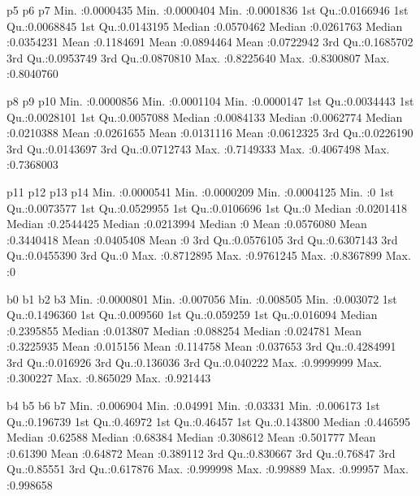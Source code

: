 \documentclass{article}
\begin{document}
\begin{Schunk}
\begin{Soutput}
       p5                  p6                  p7           
 Min.   :0.0000435   Min.   :0.0000404   Min.   :0.0001836  
 1st Qu.:0.0166946   1st Qu.:0.0068845   1st Qu.:0.0143195  
 Median :0.0570462   Median :0.0261763   Median :0.0354231  
 Mean   :0.1184691   Mean   :0.0894464   Mean   :0.0722942  
 3rd Qu.:0.1685702   3rd Qu.:0.0953749   3rd Qu.:0.0870810  
 Max.   :0.8225640   Max.   :0.8300807   Max.   :0.8040760  
                                                            
       p8                  p9                 p10           
 Min.   :0.0000856   Min.   :0.0001104   Min.   :0.0000147  
 1st Qu.:0.0034443   1st Qu.:0.0028101   1st Qu.:0.0057088  
 Median :0.0084133   Median :0.0062774   Median :0.0210388  
 Mean   :0.0261655   Mean   :0.0131116   Mean   :0.0612325  
 3rd Qu.:0.0226190   3rd Qu.:0.0143697   3rd Qu.:0.0712743  
 Max.   :0.7149333   Max.   :0.4067498   Max.   :0.7368003  
                                                            
      p11                 p12                 p13                 p14   
 Min.   :0.0000541   Min.   :0.0000209   Min.   :0.0004125   Min.   :0  
 1st Qu.:0.0073577   1st Qu.:0.0529955   1st Qu.:0.0106696   1st Qu.:0  
 Median :0.0201418   Median :0.2544425   Median :0.0213994   Median :0  
 Mean   :0.0576080   Mean   :0.3440418   Mean   :0.0405408   Mean   :0  
 3rd Qu.:0.0576105   3rd Qu.:0.6307143   3rd Qu.:0.0455390   3rd Qu.:0  
 Max.   :0.8712895   Max.   :0.9761245   Max.   :0.8367899   Max.   :0  
                                                                        
       b0                  b1                 b2                 b3          
 Min.   :0.0000801   Min.   :0.007056   Min.   :0.008505   Min.   :0.003072  
 1st Qu.:0.1496360   1st Qu.:0.009560   1st Qu.:0.059259   1st Qu.:0.016094  
 Median :0.2395855   Median :0.013807   Median :0.088254   Median :0.024781  
 Mean   :0.3225935   Mean   :0.015156   Mean   :0.114758   Mean   :0.037653  
 3rd Qu.:0.4284991   3rd Qu.:0.016926   3rd Qu.:0.136036   3rd Qu.:0.040222  
 Max.   :0.9999999   Max.   :0.300227   Max.   :0.865029   Max.   :0.921443  
                                                                             
       b4                 b5                b6                b7          
 Min.   :0.006904   Min.   :0.04991   Min.   :0.03331   Min.   :0.006173  
 1st Qu.:0.196739   1st Qu.:0.46972   1st Qu.:0.46457   1st Qu.:0.143800  
 Median :0.446595   Median :0.62588   Median :0.68384   Median :0.308612  
 Mean   :0.501777   Mean   :0.61390   Mean   :0.64872   Mean   :0.389112  
 3rd Qu.:0.830667   3rd Qu.:0.76847   3rd Qu.:0.85551   3rd Qu.:0.617876  
 Max.   :0.999998   Max.   :0.99889   Max.   :0.99957   Max.   :0.998658  
                                                                          

\end{Soutput}
\end{Schunk}
\end{document}

